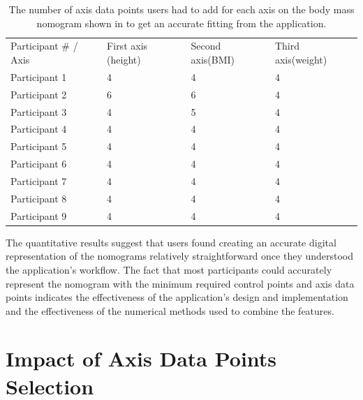 \documentclass{l4proj}
\begin{document}
\begin{table}[H]
\begin{tabular}{llll}
Participant \# / Axis & First axis (height)       & Second axis(BMI)          & Third axis(weight)        \\
Participant 1         & \cellcolor[HTML]{DDEBF7}4 & \cellcolor[HTML]{DDEBF7}4 & \cellcolor[HTML]{DDEBF7}4 \\
Participant 2         & 6                         & 6                         & 4                         \\
Participant 3         & \cellcolor[HTML]{DDEBF7}4 & \cellcolor[HTML]{DDEBF7}5 & \cellcolor[HTML]{DDEBF7}4 \\
Participant 4         & 4                         & 4                         & 4                         \\
Participant 5         & \cellcolor[HTML]{DDEBF7}4 & \cellcolor[HTML]{DDEBF7}4 & \cellcolor[HTML]{DDEBF7}4 \\
Participant 6         & 4                         & 4                         & 4                         \\
Participant 7         & \cellcolor[HTML]{DDEBF7}4 & \cellcolor[HTML]{DDEBF7}4 & \cellcolor[HTML]{DDEBF7}4 \\
Participant 8         & 4                         & 4                         & 4                         \\
Participant 9         & \cellcolor[HTML]{DDEBF7}4 & \cellcolor[HTML]{DDEBF7}4 & \cellcolor[HTML]{DDEBF7}4
\end{tabular}
\label{fig:quanti-eval-results-table}
\caption{The number of axis data points users had to add for each axis on the body mass nomogram shown in  to get an accurate fitting from the application. }
\end{table}

The quantitative results suggest that users found creating an accurate digital representation of the nomograms relatively straightforward once they understood the application's workflow. The fact that most participants could accurately represent the nomogram with the minimum required control points and axis data points indicates the effectiveness of the application's design and implementation and the effectiveness of the numerical methods used to combine the features. 

\section{Impact of Axis Data Points Selection}
\end{document}
